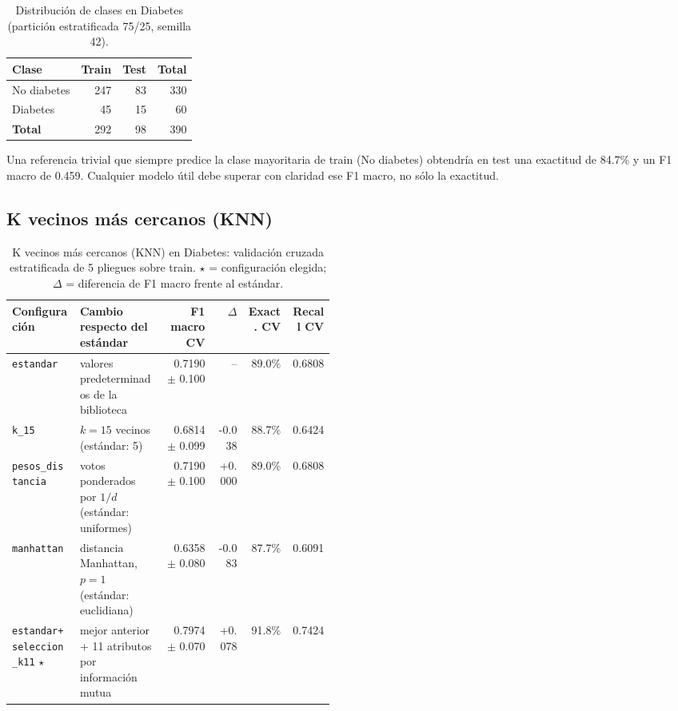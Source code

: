 \documentclass[11pt]{article}
\begin{document}
\begin{table}[H]\centering\small
\caption{Distribución de clases en Diabetes (partición estratificada 75/25, semilla 42).}
\begin{tabular}{lrrr}\toprule
Clase & Train & Test & Total \\ \midrule
No diabetes & 247 & 83 & 330 \\
Diabetes & 45 & 15 & 60 \\
\textbf{Total} & 292 & 98 & 390 \\
\bottomrule\end{tabular}
\end{table}

Una referencia trivial que siempre predice la clase mayoritaria de train (No diabetes) obtendría en test una exactitud de 84.7\% y un F1 macro de 0.459. Cualquier modelo útil debe superar con claridad ese F1 macro, no sólo la exactitud.

\subsection{K vecinos más cercanos (KNN)}

\begin{table}[H]\centering\footnotesize
\caption{K vecinos más cercanos (KNN) en Diabetes: validación cruzada estratificada de 5 pliegues sobre train. $\star$ = configuración elegida; $\Delta$ = diferencia de F1 macro frente al estándar.}
\begin{tabular}{>{\raggedright\arraybackslash}p{0.21\linewidth}>{\raggedright\arraybackslash}p{0.26\linewidth}rrrr}\toprule
Configuración & Cambio respecto del estándar & F1 macro CV & $\Delta$ & Exact. CV & Recall CV \\ \midrule
\texttt{estandar} & valores predeterminados de la biblioteca & 0.7190 $\pm$ 0.100 & -- & 89.0\% & 0.6808 \\
\texttt{k\_\allowbreak{}15} & $k=15$ vecinos (estándar: 5) & 0.6814 $\pm$ 0.099 & -0.038 & 88.7\% & 0.6424 \\
\texttt{pesos\_\allowbreak{}distancia} & votos ponderados por $1/d$ (estándar: uniformes) & 0.7190 $\pm$ 0.100 & +0.000 & 89.0\% & 0.6808 \\
\texttt{manhattan} & distancia Manhattan, $p=1$ (estándar: euclidiana) & 0.6358 $\pm$ 0.080 & -0.083 & 87.7\% & 0.6091 \\
\texttt{estandar+\allowbreak{}seleccion\_\allowbreak{}k11} $\star$ & mejor anterior + 11 atributos por información mutua & 0.7974 $\pm$ 0.070 & +0.078 & 91.8\% & 0.7424 \\
\bottomrule\end{tabular}
\end{table}
\end{document}
